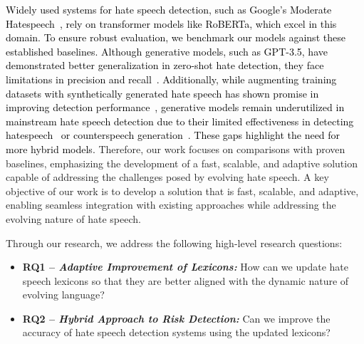 \textcolor{black}{Widely used systems for hate speech detection, such as Google's Moderate Hatespeech~\cite{moderatehatespeech}, rely on transformer models like RoBERTa, which excel in this domain. To ensure robust evaluation, we benchmark our models against these established baselines. Although generative models, such as GPT-3.5, have demonstrated better generalization in zero-shot hate detection, they face limitations in precision and recall~\cite{Pendzel2023GenerativeAF}. Additionally, while augmenting training datasets with synthetically generated hate speech has shown promise in improving detection performance~\cite{Cao2020HateGANAG, Wullach2020TowardsHS}, generative models remain underutilized in mainstream hate speech detection due to their limited effectiveness in detecting hatespeech~\cite{Pendzel2023GenerativeAF} or counterspeech generation~\cite{Bar2024GenerativeAM}. These gaps highlight the need for more hybrid models.} Therefore, our work focuses on comparisons with proven baselines, emphasizing the development of a fast, scalable, and adaptive solution capable of addressing the challenges posed by evolving hate speech. A key objective of our work is to develop a solution that is fast, scalable, and adaptive, enabling seamless integration with existing approaches while addressing the evolving nature of hate speech.

Through our research, we address the following high-level research questions:

\begin{itemize}
	\item \textbf{RQ1 -- \textit{Adaptive Improvement of Lexicons:}} How can we update hate speech lexicons so that they are better aligned with the dynamic nature of evolving language?
	
	\item \textbf{RQ2 -- \textit{Hybrid Approach to Risk Detection:}} Can we improve the accuracy of hate speech detection systems using the updated lexicons?
\end{itemize}

